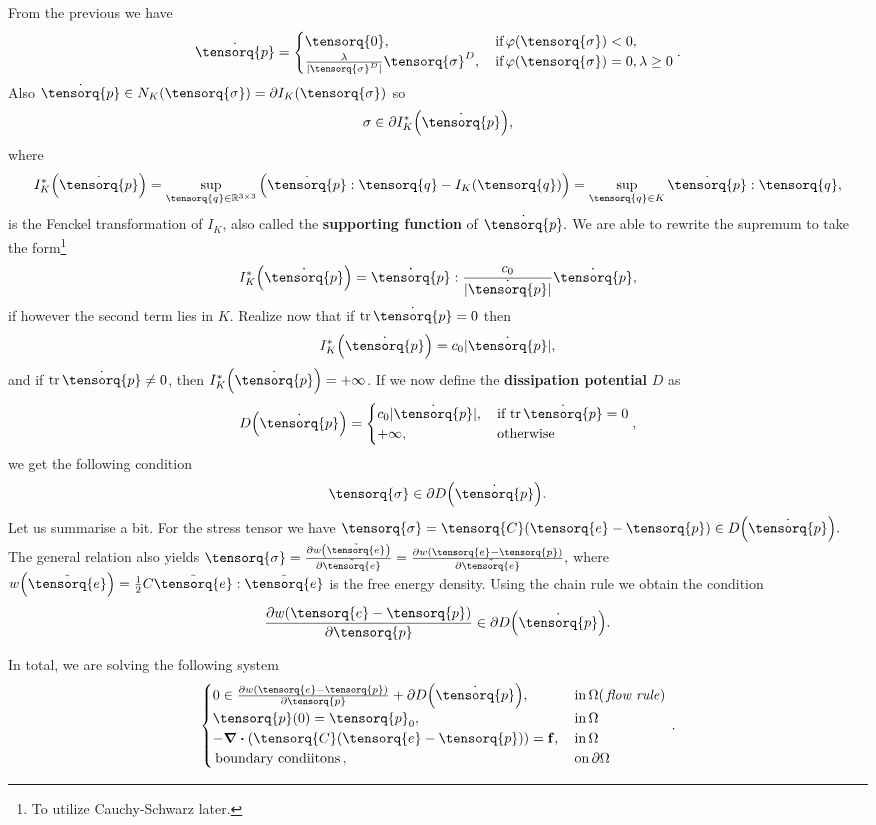 \documentclass[reqno, a4paper]{article}
\begin{document}
From the previous we have
\[
	\dot{\tensorq{p}} = \begin{cases}
		\tensorq{0}, & \, \text{if} \, \varphi\qty(\tensorq{\sigma})<0, \\
		\frac{\lambda}{|\tensorq{\sigma}^D|}\tensorq{\sigma}^D, & \, \text{if} \, \varphi\qty(\tensorq{\sigma}) = 0, \lambda \geq 0
	\end{cases}.
\]
Also $\dot{\tensorq{p}} \in N_K\qty(\tensorq{\sigma}) = \partial I_K\qty(\tensorq{\sigma})$ so
\[
	\sigma \in \partial I_K^{*}\qty(\dot{\tensorq{p}}),
\]
where
\[
	I_K^{*}\qty(\dot{\tensorq{p}}) = \sup_{\tensorq{q}\in \R^{3 \times 3}}\qty(\dot{\tensorq{p}}: \tensorq{q}- I_K\qty(\tensorq{q})) = \sup_{\tensorq{q}\in K}\dot{\tensorq{p}}: \tensorq{q},
\]
is the Fenckel transformation of $I_K$, also called the \textbf{supporting function} of $\dot{\tensorq{p}}.$ We are able to rewrite the supremum to take the form\footnote{To utilize Cauchy-Schwarz later.}
\[
	I_K^{*}\qty(\dot{\tensorq{p}}) = \dot{\tensorq{p}} : \frac{c_0}{|\dot{\tensorq{p}}|}\dot{\tensorq{p}},
\]
if however the second term lies in $K$. Realize now that if $\tr \dot{\tensorq{p}} = 0$ then
\[
	I_K^{*}\qty(\dot{\tensorq{p}}) = c_0 |\dot{\tensorq{p}}|,
\]
and if $\tr \dot{\tensorq{p}} \neq 0$, then $I_K^{*}\qty(\dot{\tensorq{p}})= + \infty$. If we now define the \textbf{dissipation potential} $D$ as
\[
	D\qty(\dot{\tensorq{p}}) = \begin{cases}
		c_0 |\dot{\tensorq{p}}|, & \, \text{if} \, \tr \dot{\tensorq{p}} = 0 \\
		+ \infty, & \, \text{otherwise} \,
	\end{cases},
\]
we get the following condition
\[
	\tensorq{\sigma} \in \partial D\qty(\dot{\tensorq{p}}).
\]
Let us summarise a bit. For the stress tensor we have $\tensorq{\sigma} = \tensorq{C}\qty(\tensorq{e}-\tensorq{p}) \in D\qty(\dot{\tensorq{p}}).$ The general relation also yields $\tensorq{\sigma}= \pdv{w\qty(\tilde{\tensorq{e}})}{\tilde{\tensorq{e}}} = \pdv{w\qty(\tensorq{e}-\tensorq{p})}{\tilde{\tensorq{e}}}, $ where $w\qty(\tilde{\tensorq{e}}) = \frac{1}{2}C \tilde{\tensorq{e}}: \tilde{\tensorq{e}}$ is the free energy density. Using the chain rule we obtain the condition
\[
	\pdv{w\qty(\tensorq{e}-\tensorq{p})}{\tensorq{p}} \in \partial D\qty(\dot{\tensorq{p}}).
\]

In total, we are solving the following system 
\begin{equation*}
    \begin{cases}
	    0 \in \pdv{w\qty(\tensorq{e}-\tensorq{p})}{\tensorq{p}} + \partial D\qty(\dot{\tensorq{p}}), & \, \text{in} \, \Omega (\, \text{\textit{flow rule}}) \, \\
	    \tensorq{p}(0) = \tensorq{p}_0, & \, \text{in} \, \Omega \\
	    - \divergence{\qty(\tensorq{C}\qty(\tensorq{e}-\tensorq{p}))}= \vb{f}, &\, \text{in} \,\Omega \\
	    \, \text{boundary condiitons} \,, & \, \text{on} \,\partial \Omega
    \end{cases}.
\end{equation*}
\end{document}
